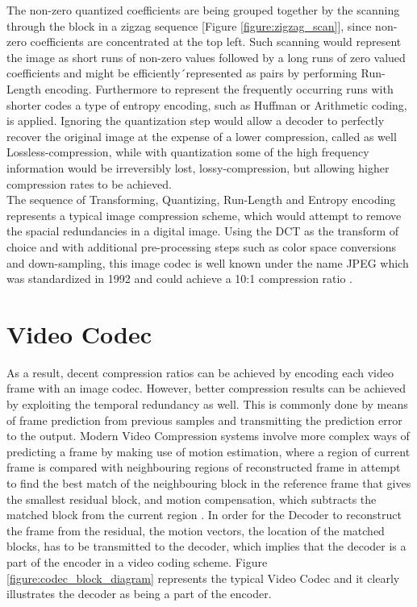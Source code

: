 \documentclass[a4paper,11pt,oneside]{article}
\begin{document}
The non-zero quantized coefficients are being grouped together by the scanning through the block in a zigzag sequence [Figure \ref{figure:zigzag_scan}], since non-zero coefficients are concentrated at the top left. Such scanning would represent the image as short runs of non-zero values followed by a long runs of zero valued coefficients and might be efficiently´represented as pairs by performing Run-Length encoding. Furthermore to represent the frequently occurring runs with shorter codes a type of entropy encoding, such as Huffman or Arithmetic coding, is applied. Ignoring the quantization step would allow a decoder to perfectly recover the original image at the expense of a lower compression, called as well Lossless-compression, while with quantization some of the high frequency information would be irreversibly lost, lossy-compression, but allowing higher compression rates to be achieved. \\ 
\indent The sequence of Transforming, Quantizing, Run-Length and Entropy encoding represents a typical image compression scheme, which would attempt to remove the spacial redundancies in a digital image. Using the DCT as the transform of choice and with additional pre-processing steps such as color space conversions and down-sampling, this image codec is well known under the name JPEG which was standardized in 1992 and could achieve a 10:1 compression ratio \cite{jpeg_nasa}. \\
\section{Video Codec}
\indent As a result, decent compression ratios can be achieved by encoding each video frame with an image codec. However, better compression results can be achieved by exploiting the temporal redundancy as well. This is commonly done by means of frame prediction from previous samples and transmitting the prediction error to the output. Modern Video Compression systems involve more complex ways of predicting a frame by making use of motion estimation, where a region of current frame is compared with neighbouring regions of reconstructed frame in attempt to find the best match of the neighbouring block in the reference frame that gives the smallest residual block, and motion compensation, which subtracts the matched block from the current region \cite[p.~44]{richardson2002video}. In order for the Decoder to reconstruct the frame from the residual, the motion vectors, the location of the matched blocks, has to be transmitted to the decoder, which implies that the decoder is a part of the encoder in a video coding scheme. Figure \ref{figure:codec_block_diagram} represents the typical Video Codec and it clearly illustrates the decoder as being a part of the encoder. \\
\end{document}
